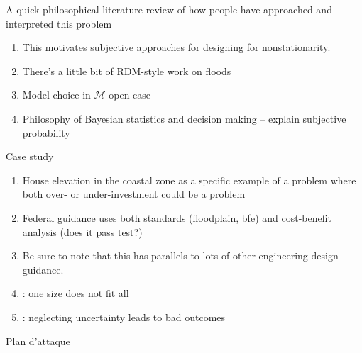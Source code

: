 \documentclass[12pt]{article}
\begin{document}
A quick philosophical literature review of how people have approached and interpreted this problem
\begin{enumerate}
    \item This motivates subjective approaches for designing for nonstationarity.
    \item There's a little bit of RDM-style work on floods \citep{sriver_sealevel:2018,garner_slrise:2018,lempert_slr:2012}
    \item Model choice in $\mathcal{M}$-open case
    \item Philosophy of Bayesian statistics and decision making -- explain subjective probability
\end{enumerate}
Case study
\begin{enumerate}
    \item House elevation in the coastal zone as a specific example of a problem where both over- or under-investment could be a problem
    \item Federal guidance uses both standards (floodplain, \gls{bfe}) and cost-benefit analysis (does it pass test?)
    \item Be sure to note that this has parallels to lots of other engineering design guidance.
    \item \citet{xian_elevation:2017}: one size does not fit all
    \item \citet{zarekarizi_suboptimal:2020}: neglecting uncertainty leads to bad outcomes
\end{enumerate}
Plan d'attaque
\end{document}
